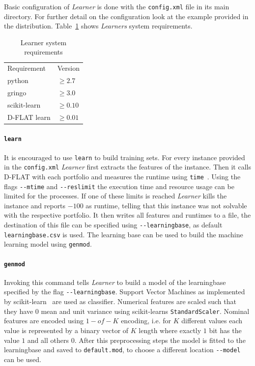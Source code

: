 Basic configuration of \emph{Learner} is done with the \lstinline$config.xml$ file in its main directory. For further detail on the configuration look at the example provided in the distribution. Table~\ref{tbl:req} shows \emph{Learners} system requirements.

\begin{table}[h]
	\center
	\begin{tabular}{ll}
		Requirement & Version\\
		python & $\geq2.7$\\
		gringo & $\geq3.0$\\
		scikit-learn & $\geq0.10$\\
		D-FLAT learn & $\geq0.01$
	\end{tabular}
	\caption{Learner system requirements \label{tbl:req}}
\end{table}

\paragraph{\lstinline$learn$}
It is encouraged to use \lstinline$learn$ to build training sets. For every instance provided in the \lstinline$config.xml$ \emph{Learner} first extracts the features of the instance. Then it calls D-FLAT with each portfolio and measures the runtime using \lstinline$time$~\cite{www:time}.
Using the flags \lstinline$--mtime$ and \lstinline$--reslimit$ the execution time and resource usage can be limited for the processes. If one of these limits is reached \emph{Learner} kills the instance and reports $-100$ as runtime, telling that this instance was not solvable with the respective portfolio. It then writes all features and runtimes to a file, the destination of this file can be specified using \lstinline$--learningbase$, as default \lstinline$learningbase.csv$ is used. The learning base can be used to build the machine learning model using \lstinline$genmod$.

\paragraph{\lstinline$genmod$}
Invoking this command tells \emph{Learner} to build a model of the learningbase specified by the flag \lstinline$--learningbase$. Support Vector Machines as implemented by scikit-learn~\cite{www:scikit} are used as classifier. Numerical features are scaled such that they have $0$ mean and unit variance using scikit-learns \lstinline$StandardScaler$. 
Nominal features are encoded using $1-of-K$ encoding, i.e. for $K$ different values each value is represented by a binary vector of $K$ length where exactly $1$ bit has the value $1$ and all others $0$.
After this preprocessing steps the model is fitted to the learningbase and saved to \lstinline$default.mod$, to choose a different location \lstinline$--model$ can be used.

